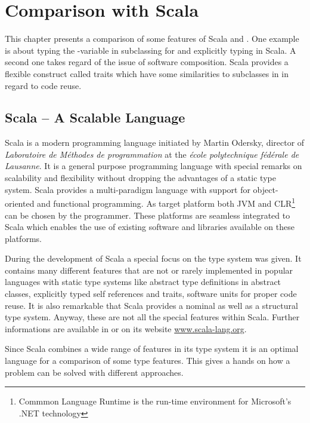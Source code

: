 \chapter{Comparison with Scala}
\label{sec:comparisonScala}
This chapter presents a comparison of some features of Scala and \ooplss.
One example is about typing the \self-variable in subclassing for
\ooplss and explicitly typing in Scala. A second one takes regard of the
issue of software composition. Scala provides a flexible construct called
traits which have some similarities to subclasses in \ooplss in regard to
code reuse.

\section{Scala -- A Scalable Language}
Scala is a modern programming language initiated by Martin Odersky,
director of \emph{Laboratoire de Méthodes de programmation} at the
\emph{école polytechnique fédérale de Lausanne}. It is a general
purpose programming language with special remarks on scalability
and flexibility without dropping the advantages of a static type
system. Scala provides a multi-paradigm language with support for
object-oriented and functional programming. As target platform both JVM
and CLR\footnote{Commmon Language Runtime is the run-time environment
for Microsoft's .NET technology} can be chosen by the programmer. These
platforms are seamless integrated to Scala which enables the use of
existing software and libraries available on these platforms.

During the development of Scala a special focus on the type system was
given. It contains many different features that are not or
rarely implemented in popular languages with static type systems
like abstract type definitions in abstract classes, explicitly typed self
references and traits, software units for proper code reuse. It is also
remarkable that Scala provides a nominal as well as a structural
type system. Anyway, these are not all the special features within
Scala. Further informations are available in
\cite{odersky_scala_2010,odersky_programming_2008} or on its website
\href{http://www.scala-lang.org/}{www.scala-lang.org}.

Since Scala combines a wide range of features in its type system it is
an optimal language for a comparison of some type features. This gives
a hands on how a problem can be solved with different approaches.


